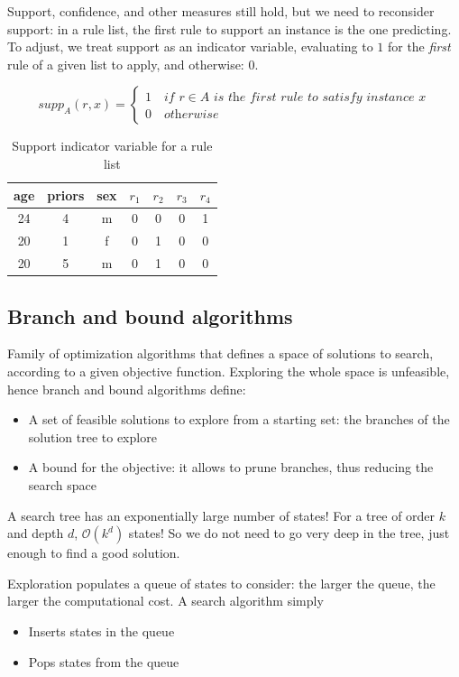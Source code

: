  Support, confidence, and other measures still hold, but we need to reconsider support: in
a rule list, the first rule to support an instance is the one predicting.
To adjust, we treat support as an indicator variable, evaluating to $1$ for the \textit{first} rule of a given list to apply, and otherwise: $0$.

\[
supp_A(r,x) = \begin{cases}
   1 \quad \textit{if } r \in A \textit{ is the first rule to satisfy instance } x\\
   0 \quad \textit{otherwise}
\end{cases}
\]


\begin{table}[htbp]
   \centering
   \begin{tabular}{|c|c|c|c|c|c|c|}
      \hline
      age & priors & sex & $r_1$ & $r_2$ & $r_3$ & $r_4$ \\
      \hline
      24 & 4 & m & 0 & 0 & 0 & 1 \\
      20 & 1 & f & 0 & 1 & 0 & 0 \\
      20 & 5 & m & 0 & 1 & 0 & 0 \\
      \hline
   \end{tabular}
   \caption{Support indicator variable for a rule list}
   \label{tab:08/support_indicator}
\end{table}

\subsection{Branch and bound algorithms}

Family of optimization algorithms that defines a space of solutions to search, according
to a given objective function. Exploring the whole space is unfeasible, hence branch and
bound algorithms define:
\begin{itemize}
	\item A set of feasible solutions to explore from a starting set: the branches of the solution tree to explore
	\item A bound for the objective: it allows to prune branches, thus reducing the search space
\end{itemize}

A search tree has an
exponentially large number
of states! For a tree of order $k$ and depth $d$, $\mathcal{O}(k^d)$ states!
So we do not need to go very deep in the tree, just enough to find a good solution.

Exploration populates a queue of states to consider: the larger the queue, the larger the computational cost. A search algorithm simply
\begin{itemize}
	\item Inserts states in the queue
	\item Pops states from the queue
\end{itemize}

